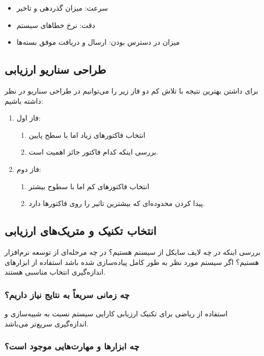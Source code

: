 \begin{itemize}
    \item سرعت: میزان گذردهی و تاخیر
    \item دقت: نرخ خطا‌های سیستم
    \item میزان در دسترس بودن: ارسال و دریافت موفق بسته‌ها
\end{itemize}

\subsection{طراحی سناریو ارزیابی}

برای داشتن بهترین نتیجه با تلاش کم دو فاز زیر را می‌توانیم در طراحی سناریو در
نظر داشته باشیم:

\begin{enumerate}
    \item فاز اول:
    \begin{enumerate}
        \item انتخاب فاکتور‌های زیاد اما با سطح پایین
        \item بررسی اینکه کدام فاکتور حائز اهمیت است.
    \end{enumerate}
    \item فاز دوم:
    \begin{enumerate}
        \item انتخاب فاکتور‌های کم اما با سطوح بیشتر
        \item پیدا کردن محدوده‌ای که بیشترین تاثیر را روی فاکتور‌ها دارد.
    \end{enumerate}
\end{enumerate}

\subsection{انتخاب تکنیک و متریک‌های ارزیابی}

بررسی اینکه در چه لایف سایکل از سیستم هستیم؟ در چه مرحله‌ای از توسعه نرم‌افزار
هستیم؟ اگر سیستم مورد نظر به طور کامل پیاده‌سازی شده باشد استفاده از ابزار‌های
اندازه‌گیری انتخاب مناسبی هستند.

\subsubsection{چه زمانی سریعاً به نتایج نیاز داریم؟}

استفاده از  ریاضی برای تکنیک ارزیابی کارایی سیستم نسبت به شبیه‌سازی
و اندازه‌گیری سریع‌تر می‌باشد.

\subsubsection{چه ابزار‌ها و مهارت‌هایی موجود است؟}

